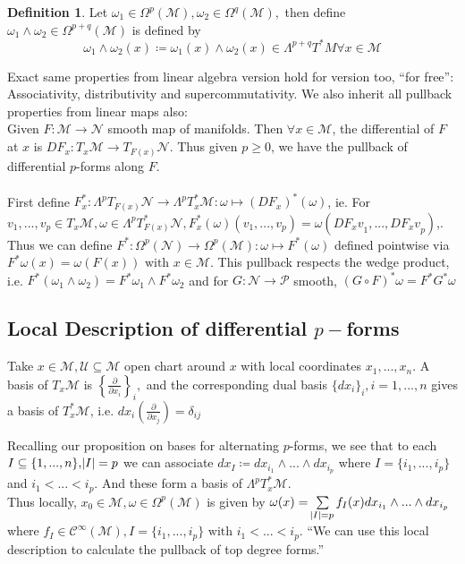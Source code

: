 \documentclass[10pt]{article}
\theoremstyle{plain}
\theoremstyle{definition}
\newtheorem{defn}[thm]{Definition} %
\newcommand{\with}{\text{ with }}
\newcommand{\man}{\mathcal{M}}
\newcommand{\nan}{\mathcal{N}}
\newcommand{\chartU}{\mathcal{U}}
\newcommand{\setform}[2]{\Lambda^{#1} {#2}}
\newcommand{\allthevs}[2]{v_{#1},...,v_{#2}}
\newcommand{\allthe}[3]{{#1}_{#2},...,{#1}_{#3}}
\newcommand{\wedgge}{\omega_1\wedge\omega_2}
\newcommand{\tang}{T_x\man}
\newcommand{\dualtang}{T_x^*\man}
\newcommand{\difftang}{\setform{p}{\dualtang}}
\newcommand{\pdifftangbundle}[1]{\setform{#1}{T^*M}}
\newcommand{\pformman}[1]{\Omega^{#1}(\man)}
\newcommand{\iparderiv}[1]{\frac{\partial}{\partial x_{#1}}}
\newcommand{\dx}{dx}
\newcommand{\mysubsection}[1]{
    \subsection{#1}
}
\begin{document}
\begin{defn}
    Let $\omega_1\in \pformman{p},\omega_2 \in \pformman{q},$ then define $\wedgge\in \pformman{p+q}$ is defined by 
    $$\wedgge(x) \coloneqq \omega_1(x) \wedge \omega_2(x) \in \pdifftangbundle{p+q}\forall x\in\man$$
\end{defn}

Exact same properties from linear algebra version hold for version too, ``for free'': Associativity, distributivity and supercommutativity. We also inherit all pullback properties from linear maps also:\\
Given $F:\man \to \nan$ smooth map of manifolds. Then $\forall x \in \man$,  the differential of $F$ at $x$ is 
$DF_x : \tang \to T_{F(x)}{\nan} $. Thus given $p\geq 0$, we have the pullback of differential $p$-forms along $F$.\\\\
\noindent
First define $F^*_x : \setform{p}{T_{F(x)}\nan} \to \difftang : \omega \mapsto (DF_x)^*(\omega)$, ie. For $\allthevs{1}{p} \in \tang, \omega \in \setform{p}{T^*_{F(x)}\nan}, F^*_x(\omega)\left( \allthevs{1}{p} \right) = \omega(\allthe{DF_x v}{1}{p})$,.
Thus we can define $F^* : \Omega^p(\nan) \to \pformman{p} : \omega \mapsto F^*(\omega)$ defined pointwise via $F^*\omega(x) = \omega(F(x)) \with x \in \man$. This pullback respects the wedge product, i.e. $F^*(\wedgge) = F^*\omega_1 \wedge F^*\omega_2$ and for $G:\nan \to \mathcal{P}$ smooth, $(G\circ F)^* \omega = F^* G^* \omega$

\mysubsection{Local Description of differential $p-$forms}
Take $x\in\man, \chartU \subseteq\man$ open chart around $x$ with local coordinates $\allthe{x}{1}{n}$. A basis of $\tang$ is $\left\{\iparderiv{i} \right\}_i,$ and the corresponding dual basis $\{\dx_i\}_i, i =1,...,n $ gives a basis of $\dualtang$, i.e. $\dx_i(\iparderiv{j}) = \delta_{ij}$

Recalling our proposition on bases for alternating $p$-forms, we see that to each $I \subseteq \{1,...,n\}, \abs{I} = p$ we can associate $\dx_I \coloneqq \dx_{i_1}\wedge...\wedge\dx_{i_p}$ where $I = \{ \allthe{i}{1}{p}\}$ and $i_1<...<i_p.$ And these form a basis of $\difftang$. \\
Thus locally, $x_0 \in \man, \omega \in \pformman{p}$ is given by $\omega(x) = \sum\limits_{\abs{I} = p} f_I(x) \dx_{i_1}\wedge ... \wedge \dx_{i_p}$ where $f_I \in \mathcal{C}^{\infty}(\man), I = \{ \allthe{i}{1}{p}\} \with i_1<...<i_p.$ ``We can use this local description to calculate the pullback of top degree forms.''
\end{document}

